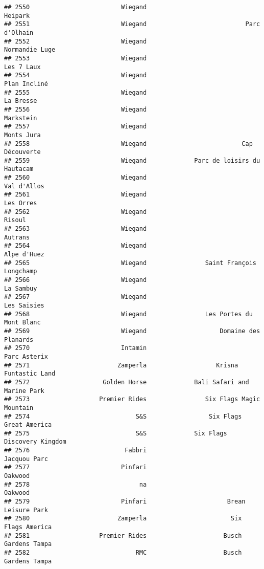 \documentclass[
]{article}
\begin{document}
\begin{verbatim}
## 2550                         Wiegand                                 Heipark
## 2551                         Wiegand                           Parc d'Olhain
## 2552                         Wiegand                          Normandie Luge
## 2553                         Wiegand                              Les 7 Laux
## 2554                         Wiegand                            Plan Incliné
## 2555                         Wiegand                               La Bresse
## 2556                         Wiegand                               Markstein
## 2557                         Wiegand                              Monts Jura
## 2558                         Wiegand                          Cap Découverte
## 2559                         Wiegand             Parc de loisirs du Hautacam
## 2560                         Wiegand                             Val d'Allos
## 2561                         Wiegand                               Les Orres
## 2562                         Wiegand                                  Risoul
## 2563                         Wiegand                                 Autrans
## 2564                         Wiegand                             Alpe d'Huez
## 2565                         Wiegand                Saint François Longchamp
## 2566                         Wiegand                               La Sambuy
## 2567                         Wiegand                             Les Saisies
## 2568                         Wiegand                Les Portes du Mont Blanc
## 2569                         Wiegand                    Domaine des Planards
## 2570                         Intamin                            Parc Asterix
## 2571                        Zamperla                   Krisna Funtastic Land
## 2572                    Golden Horse             Bali Safari and Marine Park
## 2573                   Premier Rides                Six Flags Magic Mountain
## 2574                             S&S                 Six Flags Great America
## 2575                             S&S             Six Flags Discovery Kingdom
## 2576                          Fabbri                            Jacquou Parc
## 2577                         Pinfari                                 Oakwood
## 2578                              na                                 Oakwood
## 2579                         Pinfari                      Brean Leisure Park
## 2580                        Zamperla                       Six Flags America
## 2581                   Premier Rides                     Busch Gardens Tampa
## 2582                             RMC                     Busch Gardens Tampa

\end{verbatim}
\end{document}
